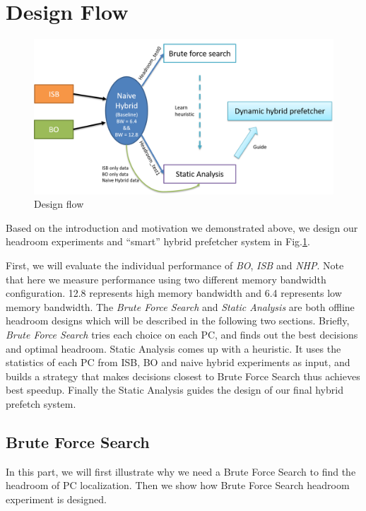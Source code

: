 \section{Design Flow}
\label{sec:designflow}

\begin{figure}[ht!]
	\centering
	\includegraphics[width=1.0\textwidth]{images/design_flow.png}
	\caption{Design flow}
	\label{fig:design_flow}
\end{figure}

Based on the introduction and motivation we demonstrated above, we design our headroom experiments and ``smart'' hybrid prefetcher system in Fig.\ref{fig:design_flow}.

First, we will evaluate the individual performance of \emph{BO}, \emph{ISB} and \emph{NHP}. Note that here we measure performance using two different memory bandwidth configuration. 12.8 represents high memory bandwidth and 6.4 represents low memory bandwidth. The \emph{Brute Force Search} and \emph{Static Analysis} are both offline headroom designs which will be described in the following two sections. Briefly, \emph{Brute Force Search} tries each choice on each PC, and finds out the best decisions and optimal headroom. Static Analysis comes up with a heuristic. It uses the statistics of each PC from ISB, BO and naive hybrid experiments as input, and builds a strategy that makes decisions closest to Brute Force Search thus achieves best speedup. Finally the Static Analysis guides the design of our final hybrid prefetch system.

  \subsection{Brute Force Search}
  \label{sec:bruteforcesearch}

  In this part, we will first illustrate why we need a Brute Force Search to find the headroom of PC localization. Then we show how Brute Force Search headroom experiment is designed. \par

